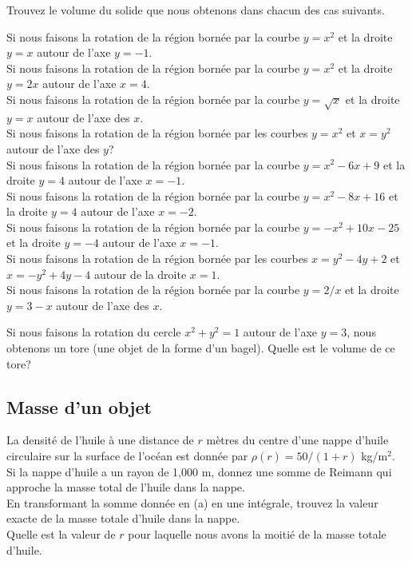 \begin{question}[\eng]
Trouvez le volume du solide que nous obtenons dans chacun des cas
suivants.

 Si nous faisons la rotation de la région bornée par la courbe
$y=x^2$ et la droite $y=x$ autour de l'axe $y=-1$.\\
 Si nous faisons la rotation de la région bornée par la courbe
$y=x^2$ et la droite $y=2x$ autour de l'axe $x=4$.\\
 Si nous faisons la rotation de la région bornée par la courbe
$y=\sqrt{x}$ et la droite $y=x$ autour de l'axe des $x$.\\
 Si nous faisons la rotation de la région bornée par les courbes
$y=x^2$ et $x=y^2$ autour de l'axe des $y$?\\
 Si nous faisons la rotation de la région bornée par la courbe
$y= x^2 -6x+9$ et la droite $y=4$ autour de l'axe $x=-1$.\\
 Si nous faisons la rotation de la région bornée par la courbe
$y= x^2 -8x+16$ et la droite $y=4$ autour de l'axe $x=-2$.\\
 Si nous faisons la rotation de la région bornée par la courbe
$y= -x^2 +10x-25$ et la droite $y=-4$ autour de l'axe $x=-1$.\\
 Si nous faisons la rotation de la région bornée par les courbes
$x = y^2-4y+2$ et $x = -y^2 +4y-4$ autour de la droite $x = 1$.\\
 Si nous faisons la rotation de la région bornée par la courbe
$y=2/x$ et la droite $y=3-x$ autour de l'axe des $x$.
\label{8Q16}
\end{question}

\begin{question}[\eng]
Si nous faisons la rotation du cercle $x^2+y^2=1$ autour de l'axe $y=3$, nous
obtenons un tore (une objet de la forme d'un bagel).  Quelle est le
volume de ce tore?
\label{8Q17}
\end{question}

\subsection{Masse d'un objet}

\begin{question}[\eng]
La densité de l'huile à une distance de $r$ mètres du centre d'une
nappe d'huile circulaire sur la surface de l'océan est donnée par
$\rho(r) = 50/(1+r)$ kg/m$^2$.\\
 Si la nappe d'huile a un rayon de 1,000 m, donnez une somme
de Reimann qui approche la masse total de l'huile dans la nappe. \\
 En transformant la somme donnée en (a) en une intégrale,
trouvez la valeur exacte de la masse totale d'huile dans la nappe.\\
 Quelle est la valeur de $r$ pour laquelle nous avons la moitié de
la masse totale d'huile.
\label{8Q18}
\end{question}

